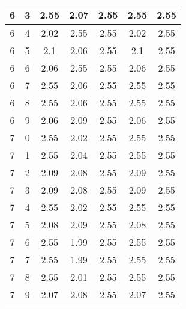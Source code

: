 \begin{longtable}{|c|c||c||c|c||c|c|}
	6 & 3 & 2.55 & 2.07 & 2.55 & 2.55 & 2.55 \\ \hline
	6 & 4 & 2.02 & 2.55 & 2.55 & 2.02 & 2.55 \\ \hline
	6 & 5 & 2.1 & 2.06 & 2.55 & 2.1 & 2.55 \\ \hline
	6 & 6 & 2.06 & 2.55 & 2.55 & 2.06 & 2.55 \\ \hline
	6 & 7 & 2.55 & 2.06 & 2.55 & 2.55 & 2.55 \\ \hline
	6 & 8 & 2.55 & 2.06 & 2.55 & 2.55 & 2.55 \\ \hline
	6 & 9 & 2.06 & 2.09 & 2.55 & 2.06 & 2.55 \\ \hline
	7 & 0 & 2.55 & 2.02 & 2.55 & 2.55 & 2.55 \\ \hline
	7 & 1 & 2.55 & 2.04 & 2.55 & 2.55 & 2.55 \\ \hline
	7 & 2 & 2.09 & 2.08 & 2.55 & 2.09 & 2.55 \\ \hline
	7 & 3 & 2.09 & 2.08 & 2.55 & 2.09 & 2.55 \\ \hline
	7 & 4 & 2.55 & 2.02 & 2.55 & 2.55 & 2.55 \\ \hline
	7 & 5 & 2.08 & 2.09 & 2.55 & 2.08 & 2.55 \\ \hline
	7 & 6 & 2.55 & 1.99 & 2.55 & 2.55 & 2.55 \\ \hline
	7 & 7 & 2.55 & 1.99 & 2.55 & 2.55 & 2.55 \\ \hline
	7 & 8 & 2.55 & 2.01 & 2.55 & 2.55 & 2.55 \\ \hline
	7 & 9 & 2.07 & 2.08 & 2.55 & 2.07 & 2.55 \\ \hline
\end{longtable}
\clearpage{}
